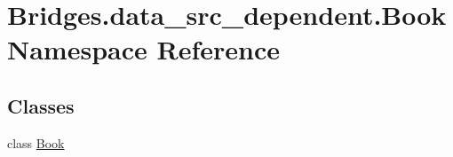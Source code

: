\hypertarget{namespace_bridges_1_1data__src__dependent_1_1_book}{}\section{Bridges.\+data\+\_\+src\+\_\+dependent.\+Book Namespace Reference}
\label{namespace_bridges_1_1data__src__dependent_1_1_book}
\subsection*{Classes}
\begin{DoxyCompactItemize}
\item 
class \hyperlink{class_bridges_1_1data__src__dependent_1_1_book_1_1_book}{Book}
\end{DoxyCompactItemize}
